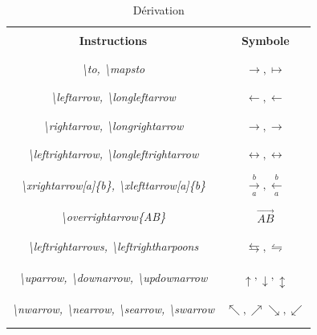 \documentclass[a4paper, 10pt]{book}
\begin{document}
\begin{table}[ht]
\caption{Dérivation}
\textit{\\}
\centering
\begin{tabular}{|c|c|}
\hline \hline \\
\textbf{Instructions} & \textbf{Symbole} \\ \\
\hline \hline \\
\textit{\textbackslash to, \textbackslash mapsto} & $ \to , \mapsto $ \\ \\
\hline \\ 
\textit{\textbackslash leftarrow, \textbackslash longleftarrow} & $ \leftarrow , \longleftarrow $ \\ \\
\hline \\
\textit{\textbackslash rightarrow, \textbackslash longrightarrow} & $ \rightarrow, \longrightarrow $ \\ \\
\hline \\
\textit{\textbackslash leftrightarrow, \textbackslash longleftrightarrow} & $ \leftrightarrow, \longleftrightarrow $ \\ \\
\hline \\
\textit{\textbackslash xrightarrow[a]\{b\}, \textbackslash xlefttarrow[a]\{b\}} & $ \xrightarrow[a]{b}, \xleftarrow[a]{b} $\\ \\
\hline \\
\textit{\textbackslash overrightarrow\{AB\}} & $ \overrightarrow{AB} $ \\ \\
\hline \\
\textit{\textbackslash leftrightarrows, \textbackslash leftrightharpoons} & $ \leftrightarrows, \leftrightharpoons $ \\ \\
\hline \\
\textit{\textbackslash uparrow, \textbackslash downarrow, \textbackslash updownarrow} & $ \uparrow, \downarrow, \updownarrow $ \\ \\
\hline \\
\textit{\textbackslash nwarrow, \textbackslash nearrow, \textbackslash searrow, \textbackslash swarrow} & $ \nwarrow, \nearrow \searrow, \swarrow $ \\ \\
\hline \\
\end{tabular} 
\end{table}
\end{document}
